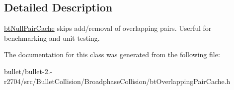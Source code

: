 \subsection{Detailed Description}
\hyperlink{classbt_null_pair_cache}{bt\+Null\+Pair\+Cache} skips add/removal of overlapping pairs. Userful for benchmarking and unit testing. 

The documentation for this class was generated from the following file\+:\begin{DoxyCompactItemize}
\item 
bullet/bullet-\/2.-\/r2704/src/\+Bullet\+Collision/\+Broadphase\+Collision/bt\+Overlapping\+Pair\+Cache.\+h\end{DoxyCompactItemize}
